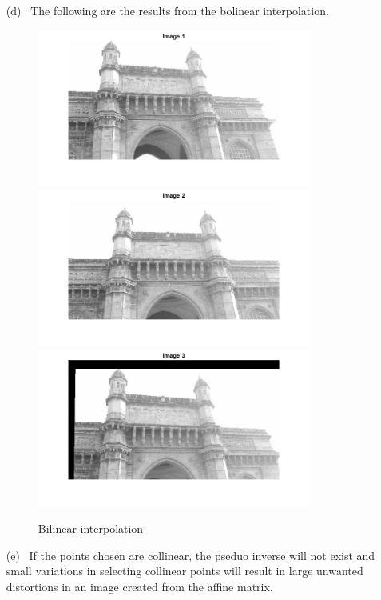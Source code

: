 \documentclass[11pt]{article}
\begin{document}
\begin{enumerate}
\begin{enumerate}
\pagebreak
\item[(d)] \
The following are the results from the bolinear interpolation.
\begin{figure}[!htb]
\centering
{}
  \includegraphics[width=9cm]{../images/Im1.jpg}
  \endminipage\hfill
 \includegraphics[width=9cm]{../images/Im2.jpg}
    \endminipage\hfill
  \includegraphics[width=9cm]{../images/bilinear.jpg}
  \endminipage\hfill
\caption{Bilinear interpolation}
\end{figure}

\item[(e)] \
If the points chosen are collinear, the pseduo inverse will not exist and small variations in selecting collinear points will result in large unwanted distortions in an image created from the affine matrix. 
\end{enumerate}
\end{enumerate}
\end{document}
